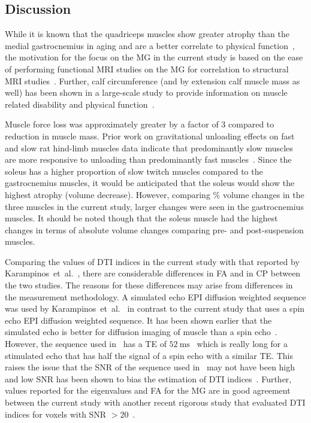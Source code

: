 \subsection{Discussion}
While it is known that the quadriceps muscles show greater atrophy than the medial gastrocnemius in aging and are a better correlate to physical function~\cite{RND27}, the motivation for the focus on the MG in the current study is based on the ease of performing functional MRI studies on the MG for correlation to structural MRI studies~\cite{RNSS4, RNCS4, Malis:2018fr, RNS16}. 
Further, calf circumference (and by extension calf muscle mass as well) has been shown in a large-scale study to provide information on muscle related disability and physical function~\cite{RND30}.

Muscle force loss was approximately greater by a factor of 3 compared to reduction in muscle mass. 
Prior work on gravitational unloading effects on fast and slow rat hind-limb muscles data indicate that predominantly slow muscles are more responsive to unloading than predominantly fast muscles~\cite{RND31}.
Since the soleus has a higher proportion of slow twitch muscles compared to the gastrocnemius muscles, it would be anticipated that the soleus would show the highest atrophy (volume decrease). 
However, comparing \% volume changes in the three muscles in the current study, larger changes were seen in the gastrocnemius muscles.  
It should be noted though that the soleus muscle had the highest changes in terms of absolute volume changes comparing pre- and post-suspension muscles.

Comparing the values of DTI indices in the current study with that reported by Karampinos~et~al.~\cite{RND12}, there are considerable differences in FA and in CP between the two studies.
The reasons for these differences may arise from differences in the measurement methodology.
A simulated echo EPI diffusion weighted sequence was used by Karampinos~et~al.~\cite{RND12} in contrast to the current study that uses a spin echo EPI diffusion weighted sequence.
It has been shown earlier that the simulated echo is better for diffusion imaging of muscle than a spin echo~\cite{RND32}. 
However, the sequence used in~\cite{RND12} has a TE of $\SI{52}{\milli\second}$~\cite{RND12} which is really long for a stimulated echo that has half the signal of a spin echo with a similar TE.
This raises the issue that the SNR of the sequence used in~\cite{RND12} may not have been high and low SNR has been shown to bias the estimation of DTI indices~\cite{RND33}.
Further, values reported for the eigenvalues and FA for the MG are in good agreement between the current study with another recent rigorous study that evaluated DTI indices for voxels with SNR $> 20$~\cite{RND33}.

